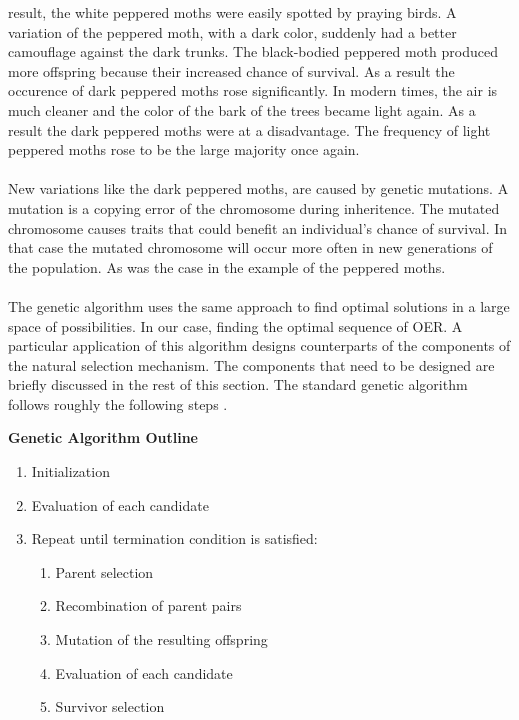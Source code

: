result, the white peppered moths were easily spotted by praying birds. A
variation of the peppered moth, with a dark color, suddenly had a better
camouflage against the dark trunks. The black-bodied peppered moth produced
more offspring because their increased chance of survival. As a result the
occurence of dark peppered moths rose significantly.
In modern times, the air is much cleaner and the color of the bark of the trees
became light again. As a result the dark peppered moths were at a disadvantage.
The frequency of light peppered moths rose to be the large majority once
again.\\\\
\noindent
New variations like the dark peppered moths, are caused by genetic mutations. A
mutation is a copying error of the chromosome during inheritence. The
mutated chromosome causes traits that could benefit an individual's chance of
survival. In that case the mutated chromosome will occur more often in new
generations of the population. As was the case in the example of the peppered
moths.\\\\
The genetic algorithm uses the same approach to find optimal solutions in a
large space of possibilities. In our case, finding the optimal sequence of OER.
A particular application of this algorithm designs counterparts of the
components of the natural selection mechanism. The components that need to be
designed are briefly discussed in the rest of this section. The standard
genetic algorithm follows roughly the following steps \citep{Eiben2007}.
\begin{leftbar}
\smallskip
\noindent
\textbf{Genetic Algorithm Outline}
\begin{enumerate}
	\item Initialization
	\item Evaluation of each candidate
	\item Repeat until termination condition is satisfied:
		\begin{enumerate}
			\item Parent selection
			\item Recombination of parent pairs
			\item Mutation of the resulting offspring
			\item Evaluation of each candidate
			\item Survivor selection
		\end{enumerate}
\end{enumerate}
\end{leftbar}

